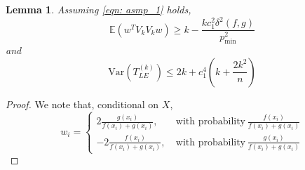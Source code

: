 \documentclass{article}
\newcommand{\Var}{\mathrm{Var}}
\newcommand{\1}{\mathbb{I}}
\newcommand{\Ebb}{\mathbb{E}}
\theoremstyle{alden}
\theoremstyle{aldenthm}
\newtheorem{lemma}{Lemma}
\theoremstyle{definition}
\theoremstyle{remark}
\begin{document}
\begin{lemma}
	Assuming \eqref{eqn: asmp_1} holds,
	\begin{equation}
	\label{eqn: expectation_noise_typeII}
	\Ebb \left( w^T V_k V_k w\right) \geq k - \frac{kc_1^2 \delta^2(f,g)}{p_{\min}^2}
	\end{equation}
	and
	\begin{equation}
	\label{eqn: variance_noise}
	\Var(T_{LE}^{(k)}) \leq 2k + c_1^4\left(k + \frac{2k^2}{n}\right)
	\end{equation}
\end{lemma}
\begin{proof}
	We note that, conditional on $X$,
	\begin{equation*}
	w_i = 
	\begin{cases}
	2\frac{g(x_i)}{f(x_i) + g(x_i)},~ & \text{with probability}~ \frac{f(x_i)}{f(x_i) + g(x_i)} \\
	-2\frac{f(x_i)}{f(x_i) + g(x_i)},~ & \text{with probability}~ \frac{g(x_i)}{f(x_i) + g(x_i)}
	\end{cases}
	\end{equation*}
	

\end{proof}
\end{document}
